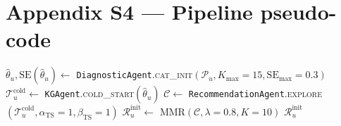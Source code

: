 %

\section*{Appendix S4 — Pipeline pseudo-code}\label{appendix:s4}

\begin{algorithm}[t]
\DontPrintSemicolon
{}

$\hat\theta_u, \mathrm{SE}(\hat\theta_u) \gets$
  \texttt{DiagnosticAgent}.\textsc{cat\_init}$(\mathcal{P}_u, K_{\max}=15, \mathrm{SE}_{\max}=0.3)$\;
$\mathcal{T}_u^{\text{cold}} \gets$ \texttt{KGAgent}.\textsc{cold\_start}$(\hat\theta_u)$
$\mathcal{C} \gets$ \texttt{RecommendationAgent}.\textsc{explore}%
  $(\mathcal{T}_u^{\text{cold}}, \alpha_{\text{TS}}=1, \beta_{\text{TS}}=1)$
$\mathcal{R}_u^{\text{init}} \gets$ \textsc{MMR}$(\mathcal{C}, \lambda=0.8, K=10)$\;
\Return $\mathcal{R}_u^{\text{init}}$\;
\caption{\texttt{ColdStartPipeline} — initial recommendation for a new user.}
\label{alg:cold_start}
\end{algorithm}

